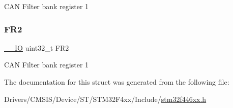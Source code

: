 C\+AN Filter bank register 1 \mbox{\label{struct_c_a_n___filter_register___type_def_a7f7d80b45b7574463d7030fc8a464582}} 
\subsubsection{\texorpdfstring{F\+R2}{FR2}}
{\footnotesize\ttfamily \mbox{\hyperlink{core__sc300_8h_aec43007d9998a0a0e01faede4133d6be}{\+\_\+\+\_\+\+IO}} uint32\+\_\+t F\+R2}

C\+AN Filter bank register 1 

The documentation for this struct was generated from the following file\+:\begin{DoxyCompactItemize}
\item 
Drivers/\+C\+M\+S\+I\+S/\+Device/\+S\+T/\+S\+T\+M32\+F4xx/\+Include/\mbox{\hyperlink{stm32f446xx_8h}{stm32f446xx.\+h}}\end{DoxyCompactItemize}
